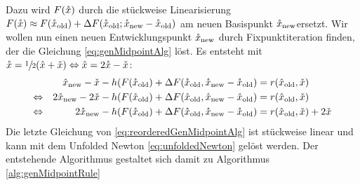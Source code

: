 Dazu wird $F(\mathring{x})$ durch die stückweise Linearisierung $F(\mathring{x})\approx F(\mathring{x}_{\text{old}})+\Delta F(\mathring{x}_{\text{old}};\mathring{x}_{\text{new}} -\mathring{x}_{\text{old}} )$ am neuen Basispunkt $\mathring{x}_{\text{new}}$ersetzt. 
Wir wollen nun einen neuen Entwicklungspunkt $\mathring{x}_{\text{new}}$ durch Fixpunktiteration finden, der die Gleichung \eqref{eq:genMidpointAlg} löst. 
Es entsteht mit $\mathring{x} = \sfrac{1}{2} (\hat x + \check x) \Leftrightarrow \hat x = 2\mathring{x} - \check x$:
\begin{equation}
\label{eq:reorderedGenMidpointAlg}
 \begin{aligned}
		 && \hat x_{\text{new}} - \check x - h (F(\mathring{x}_{\text{old}}) +\Delta F(\mathring{x}_{\text{old}},\mathring{x}_{\text{new}} - \mathring{x}_{\text{old}}) &= r(\hat x_{\text{old}},\check x)\\
 \Leftrightarrow && 2\mathring{x}_{\text{new}} - 2\check x - h (F(\mathring{x}_{\text{old}}) +\Delta F(\mathring{x}_{\text{old}},\mathring{x}_{\text{new}} - \mathring{x}_{\text{old}}) &= r(\hat x_{\text{old}},\check x)\\
 \Leftrightarrow && 2\mathring{x}_{\text{new}} -  h (F(\mathring{x}_{\text{old}}) +\Delta F(\mathring{x}_{\text{old}},\mathring{x}_{\text{new}} - \mathring{x}_{\text{old}}) &= r(\hat x_{\text{old}},\check x) + 2\check x
 \end{aligned}
\end{equation}
Die letzte Gleichung von \eqref{eq:reorderedGenMidpointAlg} ist stückweise linear und kann mit dem Unfolded Newton \eqref{eq:unfoldedNewton} gelöst werden. Der entstehende Algorithmus gestaltet sich damit zu Algorithmus \ref{alg:genMidpointRule}


